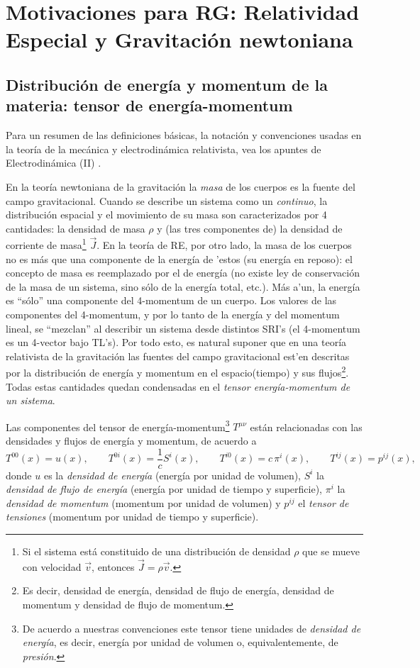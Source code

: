 \chapter{Motivaciones para RG: Relatividad Especial y Gravitación newtoniana}
\section{Distribución de energía y momentum de la materia: tensor de energía-momentum}

Para un resumen de las definiciones básicas, la notación y convenciones usadas en la teoría de la mecánica y electrodinámica relativista, vea los apuntes de Electrodinámica (II) \cite{7}.

En la teoría newtoniana de la gravitación la \textit{masa} de los cuerpos es la fuente del campo gravitacional. Cuando se describe un sistema como un \textit{continuo}, la distribución espacial y el movimiento de su masa son caracterizados por 4 cantidades: la densidad de masa $\rho$ y (las tres componentes de) la densidad de corriente de masa\footnote{Si el sistema está constituido de una distribución de densidad $\rho$ que se mueve con velocidad $\vec{v}$, entonces $\vec{J}=\rho\vec{v}$.} $\vec{J}$. En la teoría de RE, por otro lado, la masa de los cuerpos no es más que una componente de la energía de 'estos (su energía en reposo): el concepto de masa es reemplazado por el de energía (no existe ley de conservación de la masa de un sistema, sino sólo de la energía total, etc.). Más a'un, la energía es ``sólo'' una componente del 4-momentum de un cuerpo. Los valores de las componentes del 4-momentum, y por lo tanto de la energía y del momentum lineal, se ``mezclan'' al describir un sistema desde distintos SRI's (el 4-momentum es un 4-vector bajo TL's). Por todo esto, es natural suponer que en una teoría relativista de la gravitación las fuentes del campo gravitacional est'en descritas por la distribución de energía y momentum en el espacio(tiempo) y sus flujos\footnote{Es decir, densidad de energía, densidad de flujo de energía, densidad de momentum y densidad de flujo de momentum.}. Todas estas cantidades quedan condensadas en el \textit{tensor energía-momentum de un sistema}.

Las componentes del tensor de energía-momentum\footnote{De acuerdo a nuestras convenciones este tensor tiene unidades de \textit{densidad de energía}, es decir, energía por unidad de volumen o, equivalentemente, de \textit{presión}.} $T^{\mu\nu}$ están relacionadas con las densidades y flujos de energía y momentum, de acuerdo a
\begin{equation}
 T^{00}(x)=u(x), \qquad T^{0i}(x)=\frac{1}{c}S^i(x), \qquad T^{i0}(x)=c\,\pi^i(x), \qquad T^{ij}(x)=p^{ij}(x),
\end{equation}
donde $u$ es la \textit{densidad de energía} (energía por unidad de volumen), $S^i$ la \textit{densidad de flujo de energía} (energía por unidad de tiempo y superficie), $\pi^i$ la \textit{densidad de momentum} (momentum por unidad de volumen) y $p^{ij}$ el \textit{tensor de tensiones} (momentum por unidad de tiempo y superficie).

